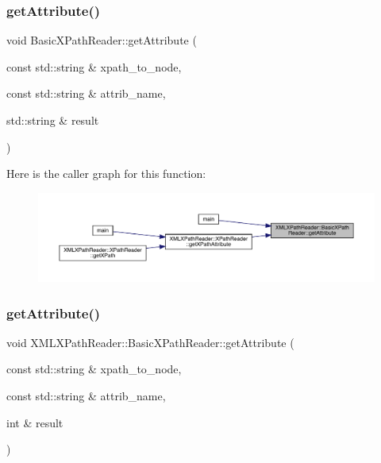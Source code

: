 \mbox{\label{classXMLXPathReader_1_1BasicXPathReader_ab35c63e2c1b2dad0485f9272f3d03ed6}} 
\subsubsection{\texorpdfstring{getAttribute()}{getAttribute()}\hspace{0.1cm}{\footnotesize\ttfamily [2/20]}}
{\footnotesize\ttfamily void Basic\+X\+Path\+Reader\+::get\+Attribute (\begin{DoxyParamCaption}\item[{const std\+::string \&}]{xpath\+\_\+to\+\_\+node,  }\item[{const std\+::string \&}]{attrib\+\_\+name,  }\item[{std\+::string \&}]{result }\end{DoxyParamCaption})}

Here is the caller graph for this function\+:\nopagebreak
\begin{figure}[H]
\begin{center}
\leavevmode
\includegraphics[width=350pt]{d6/dbf/classXMLXPathReader_1_1BasicXPathReader_ab35c63e2c1b2dad0485f9272f3d03ed6_icgraph}
\end{center}
\end{figure}
\mbox{\label{classXMLXPathReader_1_1BasicXPathReader_a67a27824521cbe011f99c2cafff83239}} 
\subsubsection{\texorpdfstring{getAttribute()}{getAttribute()}\hspace{0.1cm}{\footnotesize\ttfamily [3/20]}}
{\footnotesize\ttfamily void X\+M\+L\+X\+Path\+Reader\+::\+Basic\+X\+Path\+Reader\+::get\+Attribute (\begin{DoxyParamCaption}\item[{const std\+::string \&}]{xpath\+\_\+to\+\_\+node,  }\item[{const std\+::string \&}]{attrib\+\_\+name,  }\item[{int \&}]{result }\end{DoxyParamCaption})}

